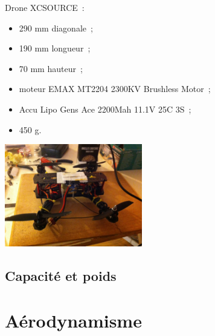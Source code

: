 \documentclass{beamer}
\begin{document}
\begin{frame}
  \begin{multicols}{2}
    Drone XCSOURCE~: \\
    \begin{itemize}
      \item 290 mm diagonale~;
      \item 190 mm longueur~;
      \item 70 mm hauteur~;
      \item moteur EMAX MT2204 2300KV Brushless Motor~;
      \item Accu Lipo Gens Ace 2200Mah 11.1V 25C 3S~;
      \item 450 g.
    \end{itemize}
    \newpage
    \begin{center}
      \includegraphics[width=6cm]{../Images/drone.JPG}
    \end{center}
  \end{multicols}
\end{frame}

\subsection{Capacité et poids}

\section{Aérodynamisme}
\end{document}
